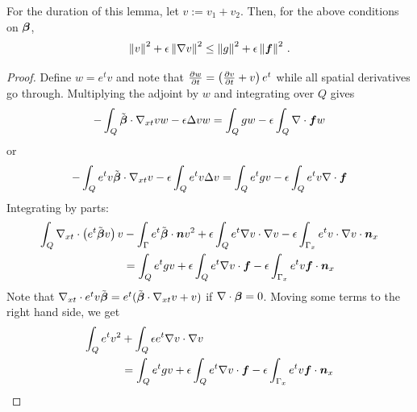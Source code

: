 \documentclass{article}
\begin{document}
\begin{lemma}
\label{lem:l2}
For the duration of this lemma, let $v:=v_1+v_2$.
Then, for the above conditions on $\boldsymbol\beta$,
\[
\left\| v \right\|^2+\epsilon\left\| \nabla v \right\|^2\leq\left\| g \right\|^2+\epsilon\left\| \boldsymbol f \right\|^2\,.
\]
\end{lemma}
\begin{proof}
Define $w=e^{t}v$ and note that $\frac{\partial w}{\partial t}=\left( \frac{\partial v}{\partial t}+v \right)e^{t}$ while
all spatial derivatives go through.
Multiplying the adjoint by $w$ and integrating over $Q$ gives
\begin{align*}
-\int_Q\tilde{\boldsymbol\beta}\cdot\nabla_{xt} vw-\epsilon\Delta vw=\int_Qgw-\epsilon\int_Q\nabla\cdot\boldsymbol f w
\end{align*}
or
\begin{align*}
-\int_Qe^{t}v\tilde{\boldsymbol\beta}\cdot\nabla_{xt} v-\epsilon\int_Q e^{t}v\Delta v=\int_Qe^{t}gv-\epsilon\int_Qe^{t}v\nabla\cdot\boldsymbol f
\end{align*}
Integrating by parts:
\begin{align*}
\int_Q\nabla_{xt}\cdot\left( e^{t}\tilde{\boldsymbol\beta} v \right)v&
-\int_\Gamma e^{t}\tilde{\boldsymbol\beta}\cdot\boldsymbol n v^2
+\epsilon\int_Qe^{t}\nabla v\cdot\nabla v
-\epsilon\int_{\Gamma_x}e^{t}v\cdot\nabla v\cdot\boldsymbol n_x
\\
&=
\int_Qe^{t}gv
+\epsilon\int_Qe^{t}\nabla v\cdot\boldsymbol f
-\epsilon\int_{\Gamma_x}e^{t}v\boldsymbol f\cdot\boldsymbol n_x
\end{align*}
Note that $\nabla_{xt}\cdot{e^{t}v\tilde{\boldsymbol\beta}}=e^{t}(\tilde{\boldsymbol\beta}\cdot\nabla_{xt} v+v)$ if $\nabla\cdot\boldsymbol\beta=0$.
Moving some terms to the right hand side, we get
\begin{align*}
\int_Q e^{t}v^2
&+\int_Q\epsilon e^{t}\Grad v\cdot\Grad v
\\
&=
\int_Qe^{t}gv
+\epsilon\int_Qe^{t}\Grad v\cdot\bff
-\epsilon\int_{\Gamma_x}e^{t}v\bff\cdot\bfn_x\\

\end{align*}
\end{proof}
\end{document}
